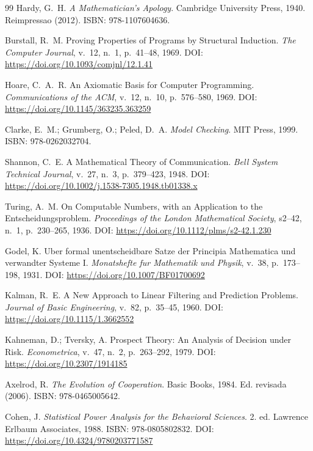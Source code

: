 \documentclass[5p]{elsarticle}
\begin{document}
\begin{thebibliography}{99}
Hardy, G.~H. \textit{A Mathematician's Apology}. Cambridge University Press, 1940. Reimpressao (2012). ISBN: 978-1107604636.

Burstall, R.~M. Proving Properties of Programs by Structural Induction. \textit{The Computer Journal}, v.~12, n.~1, p.~41--48, 1969. DOI: \url{https://doi.org/10.1093/comjnl/12.1.41}

Hoare, C.~A.~R. An Axiomatic Basis for Computer Programming. \textit{Communications of the ACM}, v.~12, n.~10, p.~576--580, 1969. DOI: \url{https://doi.org/10.1145/363235.363259}

Clarke, E.~M.; Grumberg, O.; Peled, D.~A. \textit{Model Checking}. MIT Press, 1999. ISBN: 978-0262032704.

Shannon, C.~E. A Mathematical Theory of Communication. \textit{Bell System Technical Journal}, v.~27, n.~3, p.~379--423, 1948. DOI: \url{https://doi.org/10.1002/j.1538-7305.1948.tb01338.x}

Turing, A.~M. On Computable Numbers, with an Application to the Entscheidungsproblem. \textit{Proceedings of the London Mathematical Society}, s2--42, n.~1, p.~230--265, 1936. DOI: \url{https://doi.org/10.1112/plms/s2-42.1.230}

Godel, K. Uber formal unentscheidbare Satze der Principia Mathematica und verwandter Systeme I. \textit{Monatshefte fur Mathematik und Physik}, v.~38, p.~173--198, 1931. DOI: \url{https://doi.org/10.1007/BF01700692}

Kalman, R.~E. A New Approach to Linear Filtering and Prediction Problems. \textit{Journal of Basic Engineering}, v.~82, p.~35--45, 1960. DOI: \url{https://doi.org/10.1115/1.3662552}

Kahneman, D.; Tversky, A. Prospect Theory: An Analysis of Decision under Risk. \textit{Econometrica}, v.~47, n.~2, p.~263--292, 1979. DOI: \url{https://doi.org/10.2307/1914185}

Axelrod, R. \textit{The Evolution of Cooperation}. Basic Books, 1984. Ed. revisada (2006). ISBN: 978-0465005642.

Cohen, J. \textit{Statistical Power Analysis for the Behavioral Sciences}. 2. ed. Lawrence Erlbaum Associates, 1988. ISBN: 978-0805802832. DOI: \url{https://doi.org/10.4324/9780203771587}

\end{thebibliography}
\end{document}
